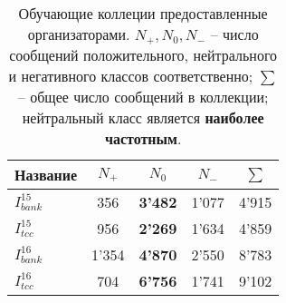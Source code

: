 \begin{table}[htp!]
\caption{Обучающие коллеции предоставленные организаторами.
        {\bf $N_+, N_0, N_-$} -- число сообщений положительного, нейтрального и
        негативного классов соответственно;
        {\bf $\sum$} -- общее число сообщений в коллекции;
        нейтральный класс является {\bf наиболее частотным}.
    }
\label{table:trainCollections}
\centering
\begin{tabular}{lcccc}
\hline
\multicolumn{1}{c|}{Название} & \multicolumn{1}{c|}{$N_+$} & \multicolumn{1}{c|}{$N_0$} & \multicolumn{1}{c|}{$N_-$} & $\sum$ \\ \hline
$I_{bank}^{15}$               & 356                        & \textbf{3'482}             & 1'077                      & 4'915  \\
$I_{tcc}^{15}$                & 956                        & \textbf{2'269}             & 1'634                      & 4'859  \\
$I_{bank}^{16}$               & 1'354                      & \textbf{4'870}             & 2'550                      & 8'783  \\
$I_{tcc}^{16}$                & 704                        & \textbf{6'756}             & 1'741                      & 9'102  \\ \hline
\end{tabular}
\end{table}
